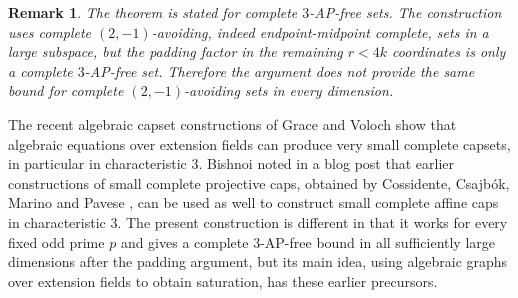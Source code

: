 \documentclass[11pt]{article}
\newtheorem{remark}[theorem]{Remark}
\begin{document}
	
	\begin{remark}
		The theorem is stated for complete $3$-AP-free sets.  The construction
		uses complete $(2,-1)$-avoiding, indeed endpoint-midpoint complete, sets in a large
		subspace, but the padding factor in the remaining $r<4k$ coordinates is only
		a complete $3$-AP-free set.  Therefore the argument does not provide the same bound for complete $(2,-1)$-avoiding sets in every
		dimension.
	\end{remark}
	
	
	The recent algebraic capset constructions of Grace
	and Voloch \cite{GraceVoloch2026} show that algebraic equations over extension
	fields can produce very small complete capsets, in particular in characteristic
	$3$. Bishnoi noted in a blog post \cite{Bishnoi2026Blog} that earlier constructions of small complete projective caps, obtained by Cossidente, Csajb\'ok, Marino and Pavese \cite{completecap}, can be used as well to construct small complete affine caps in characteristic $3$.  The present construction is different in that it works for every fixed
	odd prime $p$ and gives a complete $3$-AP-free bound in all sufficiently large
	dimensions after the padding argument, but its main idea, using
	algebraic graphs over extension fields to obtain saturation, has these earlier
	precursors.
	
\end{document}
